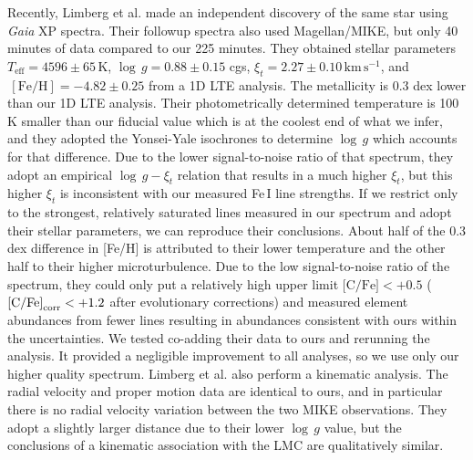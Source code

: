 \documentclass{natureprintstyle}
\newcommand{\unit}[1]{\ensuremath{\mathrm{\,#1}}\xspace}
\newcommand{\feh}{\unit{[Fe/H]}}
\newcommand{\teff}{\ensuremath{T_\mathrm{eff}}\xspace}
\newcommand{\Teff}{\teff}
\newcommand{\logg}{\ensuremath{\log\,g}\xspace}
\newcommand{\kms}{\unit{km\,s^{-1}}}
\begin{document}
Recently, Limberg et al.\cite{Limberg2025} made an independent discovery of the same star using \textit{Gaia} XP spectra\cite{Yao2024}.
Their followup spectra also used Magellan/MIKE, but only 40 minutes of data compared to our 225 minutes. They obtained stellar parameters $\Teff=4596 \pm 65$\,K, $\logg=0.88 \pm 0.15$ cgs, $\xi_t=2.27\pm0.10\kms$, and $\feh = -4.82 \pm 0.25$ from a 1D LTE analysis.
The metallicity is 0.3 dex lower than our 1D LTE analysis.
Their photometrically determined temperature is 100\,K smaller than our fiducial value which is at the coolest end of what we infer, and they adopted the Yonsei-Yale isochrones\cite{Yi2001,Demarque2004} to determine $\logg$ which accounts for that difference.
Due to the lower signal-to-noise ratio of that spectrum, they adopt an empirical $\logg-\xi_t$ relation\cite{Ji2023} that results in a much higher $\xi_t$, but this higher $\xi_t$ is inconsistent with our measured Fe\,I line strengths.
If we restrict only to the strongest, relatively saturated lines measured in our spectrum and adopt their stellar parameters, we can reproduce their conclusions. About half of the 0.3 dex difference in [Fe/H] is attributed to their lower temperature and the other half to their higher microturbulence. 
Due to the low signal-to-noise ratio of the spectrum, they could only put a relatively high upper limit $\mbox{[C/Fe]}  < +0.5$ ($\mbox{[C/Fe]}_{\rm corr} < +1.2$ after evolutionary corrections) and measured element abundances from fewer lines resulting in abundances consistent with ours within the uncertainties.
We tested co-adding their data to ours and rerunning the analysis. It provided a negligible improvement to all analyses, so we use only our higher quality spectrum.
Limberg et al. also perform a kinematic analysis. The radial velocity and proper motion data are identical to ours, and in particular there is no radial velocity variation between the two MIKE observations. They adopt a slightly larger distance due to their lower \logg value, but the conclusions of a kinematic association with the LMC are qualitatively similar.
\end{document}
